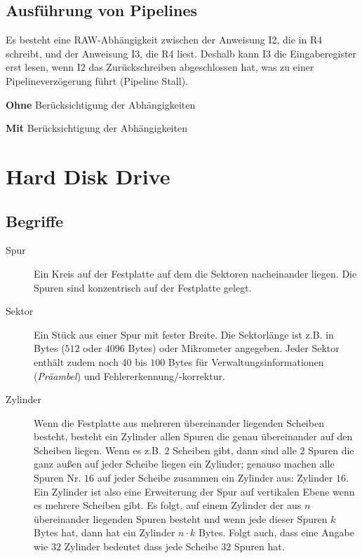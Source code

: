 \documentclass
[
	8pt,		%
	ngerman,	%
	a4paper,	%
	landscape,	%
	final		%
]{extarticle}
\begin{document}
\begin{multicols*}{4}
\subsection{Ausführung von Pipelines}
Es besteht eine RAW-Abhängigkeit zwischen der Anweisung I2, die in R4 schreibt,
und der Anweisung I3, die R4 liest. Deshalb kann I3 die Eingaberegister erst lesen,
wenn I2 das Zurückschreiben abgeschlossen hat, was zu einer Pipelineverzögerung
führt (Pipeline Stall).
\begingroup\setlength\tabcolsep{2pt}
\small
\begin{center}
	
	{\footnotesize\textbf{Ohne} Berücksichtigung der Abhängigkeiten}
\end{center}
\begin{center}
	
	{\footnotesize\textbf{Mit} Berücksichtigung der Abhängigkeiten}
\end{center}
\endgroup
\section{Hard Disk Drive}
\subsection{Begriffe}
\begin{description}
	\item[Spur]
	      Ein Kreis auf der Festplatte auf dem die Sektoren nacheinander
	      liegen. Die Spuren sind konzentrisch auf der Festplatte gelegt.

	\item[Sektor]
	      Ein Stück aus einer Spur mit fester Breite. Die Sektorlänge ist
	      z.B. in Bytes ($512$ oder $4096$ Bytes) oder Mikrometer angegeben.
	      Jeder Sektor enthält zudem noch $40$ bis $100$ Bytes für
	      Verwaltungsinformationen (\emph{Präambel}) und
	      Fehlererkennung/-korrektur.

	\item[Zylinder]
	      Wenn die Festplatte aus mehreren übereinander liegenden Scheiben
	      besteht, besteht ein Zylinder allen Spuren die genau übereinander
	      auf den Scheiben liegen. Wenn es z.B. 2 Scheiben gibt, dann sind
	      alle $2$ Spuren die ganz außen auf jeder Scheibe liegen ein
	      Zylinder; genauso machen alle Spuren Nr. $16$ auf jeder Scheibe
	      zusammen ein Zylinder aus: Zylinder $16$. Ein Zylinder ist also
	      eine Erweiterung der Spur auf vertikalen Ebene wenn es mehrere
	      Scheiben gibt. Es folgt, auf einem Zylinder der aus $n$
	      übereinander liegenden Spuren besteht und wenn jede dieser Spuren
	      $k$ Bytes hat, dann hat ein Zylinder $n \cdot k$ Bytes. Folgt
	      auch, dass eine Angabe wie $32$ Zylinder bedeutet dass jede
	      Scheibe $32$ Spuren hat.
\end{description}

\end{multicols*}
\end{document}
